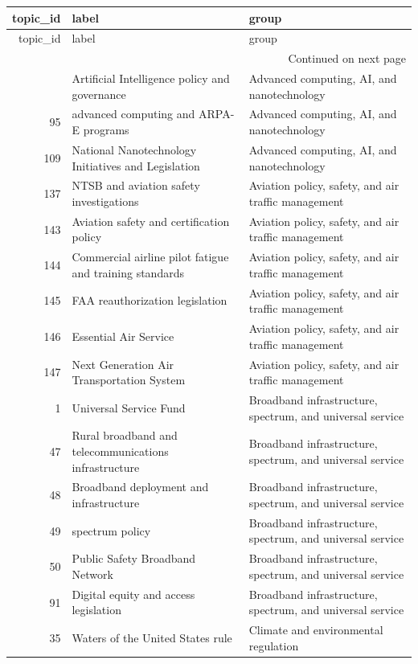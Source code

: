 \begin{longtable}{rll}
\toprule
topic_id & label & group \\
\midrule
\endfirsthead
\toprule
topic_id & label & group \\
\midrule
\endhead
\midrule
\multicolumn{3}{r}{Continued on next page} \\
\midrule
\endfoot
\bottomrule
\endlastfoot
94 & Artificial Intelligence policy and governance & Advanced computing, AI, and nanotechnology \\
95 & advanced computing and ARPA-E programs & Advanced computing, AI, and nanotechnology \\
109 & National Nanotechnology Initiatives and Legislation & Advanced computing, AI, and nanotechnology \\
137 & NTSB and aviation safety investigations & Aviation policy, safety, and air traffic management \\
143 & Aviation safety and certification policy & Aviation policy, safety, and air traffic management \\
144 & Commercial airline pilot fatigue and training standards & Aviation policy, safety, and air traffic management \\
145 & FAA reauthorization legislation & Aviation policy, safety, and air traffic management \\
146 & Essential Air Service & Aviation policy, safety, and air traffic management \\
147 & Next Generation Air Transportation System & Aviation policy, safety, and air traffic management \\
1 & Universal Service Fund & Broadband infrastructure, spectrum, and universal service \\
47 & Rural broadband and telecommunications infrastructure & Broadband infrastructure, spectrum, and universal service \\
48 & Broadband deployment and infrastructure & Broadband infrastructure, spectrum, and universal service \\
49 & spectrum policy & Broadband infrastructure, spectrum, and universal service \\
50 & Public Safety Broadband Network & Broadband infrastructure, spectrum, and universal service \\
91 & Digital equity and access legislation & Broadband infrastructure, spectrum, and universal service \\
35 & Waters of the United States rule & Climate and environmental regulation \\

\end{longtable}
